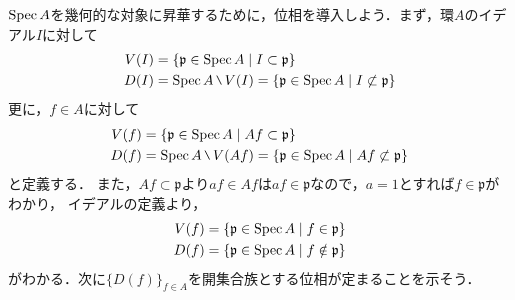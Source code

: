 
$\mathrm{Spec}\, A$を幾何的な対象に昇華するために，位相を導入しよう．まず，環$A$のイデアル$I$に対して
\begin{align*}
  V(I) &= \{\mathfrak{p} \in \spec{A}\mid I\subset \mathfrak{p}\}\\
  D(I) &= \spec{A}\mysetminus V(I) = \{\mathfrak{p} \in \spec{A}\mid I\not\subset \mathfrak{p}\}
\end{align*}
更に，$f\in A$に対して
\begin{align*}
  V(f) &= \{\mathfrak{p} \in \spec{A}\mid Af \subset \mathfrak{p}\}\\
  D(f) &= \spec{A}\mysetminus V(Af) = \{\mathfrak{p} \in \spec{A}\mid Af \not\subset \mathfrak{p}\}
\end{align*}
と定義する．
また，$Af\subset \mathfrak{p}$より$af\in Af$は$af\in \mathfrak{p}$なので，$a=1$とすれば$f\in \mathfrak{p}$がわかり，
イデアルの定義より，
\begin{align*}
  V(f) &= \{\mathfrak{p} \in \mathrm{Spec}\, A \mid f \in \mathfrak{p}\}\\
  D(f) &= \{\mathfrak{p} \in \mathrm{Spec}\, A \mid f \notin \mathfrak{p}\}
\end{align*}
がわかる．次に$\{D(f)\}_{f\in A}$を開集合族とする位相が定まることを示そう．

